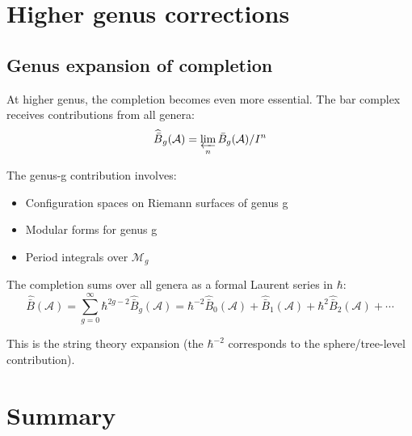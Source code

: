 \section{Higher genus corrections}

\subsection{Genus expansion of completion}

\begin{remark}\label{rem:genus-completion}
At higher genus, the completion becomes even more essential. The bar complex receives contributions from all genera:
\[\widehat{\bar{B}}_g(\mathcal{A}) = \varprojlim_n \bar{B}_g(\mathcal{A})/I^n\]

The genus-g contribution involves:
\begin{itemize}
\item Configuration spaces on Riemann surfaces of genus g
\item Modular forms for genus g
\item Period integrals over $\mathcal{M}_g$
\end{itemize}

The completion sums over all genera as a formal Laurent series in $\hbar$:
\[\widehat{\bar{B}}(\mathcal{A}) = \sum_{g=0}^{\infty} \hbar^{2g-2} \widehat{\bar{B}}_g(\mathcal{A}) = \hbar^{-2}\widehat{\bar{B}}_0(\mathcal{A}) + \widehat{\bar{B}}_1(\mathcal{A}) + \hbar^2 \widehat{\bar{B}}_2(\mathcal{A}) + \cdots\]

This is the string theory expansion (the $\hbar^{-2}$ corresponds to the sphere/tree-level contribution).
\end{remark}

\section{Summary}

